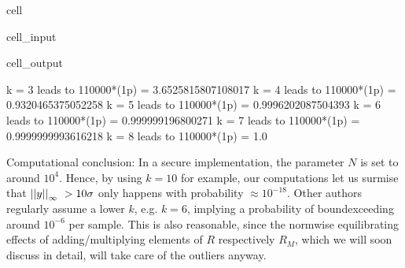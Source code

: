 \documentclass[letterpaper,10pt,english]{jupyterBook}
\begin{document}
\begin{sphinxuseclass}{cell}\begin{sphinxVerbatimInput}

\begin{sphinxuseclass}{cell_input}
\begin{sphinxVerbatim}[commandchars=\\\{\}]
  
   
      
\end{sphinxVerbatim}

\end{sphinxuseclass}\end{sphinxVerbatimInput}
\begin{sphinxVerbatimOutput}

\begin{sphinxuseclass}{cell_output}
\begin{sphinxVerbatim}[commandchars=\\\{\}]
k = 3 leads to 1\PYGZhy{}10000*(1\PYGZhy{}p) = \PYGZhy{}3.6525815807108017
k = 4 leads to 1\PYGZhy{}10000*(1\PYGZhy{}p) = 0.9320465375052258
k = 5 leads to 1\PYGZhy{}10000*(1\PYGZhy{}p) = 0.9996202087504393
k = 6 leads to 1\PYGZhy{}10000*(1\PYGZhy{}p) = 0.999999196800271
k = 7 leads to 1\PYGZhy{}10000*(1\PYGZhy{}p) = 0.9999999993616218
k = 8 leads to 1\PYGZhy{}10000*(1\PYGZhy{}p) = 1.0
\end{sphinxVerbatim}

\end{sphinxuseclass}\end{sphinxVerbatimOutput}

\end{sphinxuseclass}
\sphinxAtStartPar
Computational conclusion: In a secure implementation, the parameter \(N\) is set to around \(10^4\).
Hence, by using \(k=10\) for example, our computations let us surmise that \(\norm{y} > 10\sigma\) only happens with probability \(\approx 10^{-18}\).
Other authors regularly assume a lower \(k\), e.g. \(k=6\), implying a probability of bound\sphinxhyphen{}exceeding around \(10^{-6}\) per sample.
This is also reasonable, since the norm\sphinxhyphen{}wise equilibrating effects of adding/multiplying elements of \(R\) respectively \(R_M\), which we will soon discuss in detail, will take care of the outliers anyway.
\end{document}
